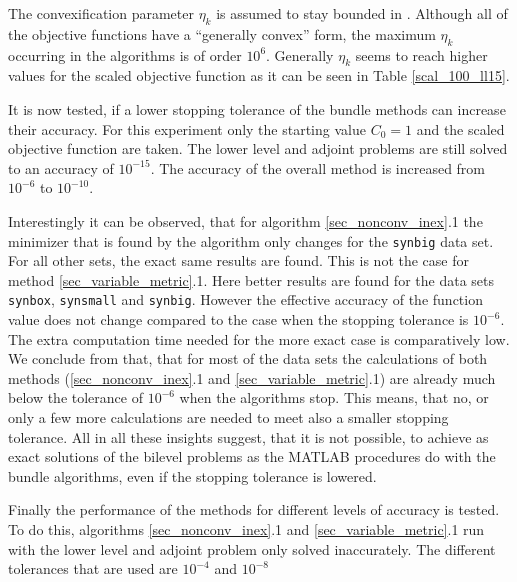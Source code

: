 The convexification parameter \(\eta_k\) is assumed to stay bounded in \cite[p. 11]{Hare2016}. Although all of the objective functions have a ``generally convex'' form, the maximum \(\eta_k\) occurring in the algorithms is of order \(10^{6}\). Generally \(\eta_k\) seems to reach higher values for the scaled objective function as it can be seen in Table \ref{scal_100_ll15}.

It is now tested, if a lower stopping tolerance of the bundle methods can increase their accuracy.
For this experiment only the starting value \(C_0 = 1\) and the scaled objective function are taken.
The lower level and adjoint problems are still solved to an accuracy of \(10^{-15}\). The accuracy of the overall method is increased from \(10^{-6}\) to \(10^{-10}\).

Interestingly it can be observed, that for algorithm \ref{sec_nonconv_inex}.1 the minimizer that is found by the algorithm only changes for the \texttt{synbig} data set. For all other sets, the exact same results are found.
This is not the case for method \ref{sec_variable_metric}.1. Here better results are found for the data sets \texttt{synbox}, \texttt{synsmall} and \texttt{synbig}.
However the effective accuracy of the function value does not change compared to the case when the stopping tolerance is \(10^{-6}\). The extra computation time needed for the more exact case is comparatively low.
We conclude from that, that for most of the data sets the calculations of both methods (\ref{sec_nonconv_inex}.1 and \ref{sec_variable_metric}.1) are already much below the tolerance of \(10^{-6}\) when the algorithms stop. This means, that no, or only a few more calculations are  needed to meet also a smaller stopping tolerance.
All in all these insights suggest, that it is not possible, to achieve as exact solutions of the bilevel problems as the MATLAB procedures do with the bundle algorithms, even if the stopping tolerance is lowered.

Finally the performance of the methods for different levels of accuracy is tested.
To do this, algorithms \ref{sec_nonconv_inex}.1 and \ref{sec_variable_metric}.1 run with the lower level and adjoint problem only solved inaccurately.
The different tolerances that are used are \(10^{-4}\) and \(10^{-8}\)  

